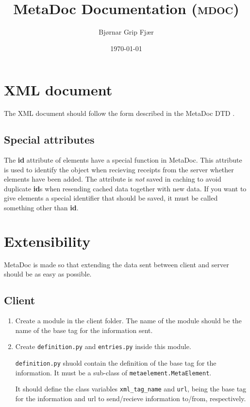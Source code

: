 \documentclass[titlepage, a4paper,10pt]{article}
\title{MetaDoc Documentation (\textsc{mdoc})}
\author{Bjørnar Grip Fjær}
\date{\today}
\begin{document}
\maketitle

\section{XML document}
The XML document should follow the form described in the MetaDoc DTD \cite{metadoc_dtd}. 

\subsection{Special attributes}

The \textbf{id} attribute of elements have a special function in MetaDoc. This attribute is used to identify the object when recieving receipts from the server whether elements have been added. 
The attribute is \textit{not} saved in caching to avoid duplicate \textbf{id}s when resending cached data together with new data. 
If you want to give elements a special identifier that should be saved, it must be called something other than \textbf{id}.

\section{Extensibility}
MetaDoc is made so that extending the data sent between client and server should be as easy as possible. 

\subsection{Client}

\begin{enumerate}
    \item
        Create a module in the client folder. The name of the module should be the name of the base tag for the information sent.
    \item
        Create \texttt{definition.py} and \texttt{entries.py} inside this module.

        \texttt{definition.py} shuold contain the definition of the base tag for the information. It must be a sub-class of \texttt{metaelement.MetaElement}.

        It should define the class variables \texttt{xml\_tag\_name} and \texttt{url}, being the base tag for the information and url to send/recieve information to/from, respectively. 

\end{enumerate}
\end{document}
